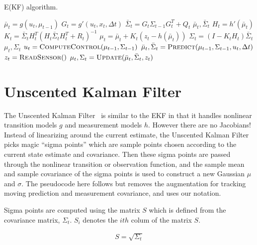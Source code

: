 \documentclass{article}
\begin{document}
\begin{algorithm}
  \caption{E(KF)  algorithm.  }  
  \begin{algorithmic}[1]
    \State $\bar{\mu}_t = g(u_t, \mu_{t-1})$
    \State $G_t = g'(u_t, x_t, \Delta t)$
    \State $\bar{\Sigma}_t = G_t\Sigma_{t-1}G_t^T + Q_t$
    \State \Return $\bar{\mu}_t, \bar{\Sigma}_t$
    \EndFunction
    \State $H_t = h'(\bar{\mu}_t)$
    \State $K_t = \bar{\Sigma}_t H_t^T(H_t \bar{\Sigma}_t H_t^T + R_t)^{-1}$
    \State $\mu_t = \bar{\mu}_t + K_t(z_t - h(\bar{\mu}_t))$
    \State $\Sigma_t = (I - K_t H_t) \bar{\Sigma}_t$
    \State \Return $\mu_t, \Sigma_t$
    \EndFunction
    \State $u_t = \textsc{ComputeControl}(\mu_{t-1}, \Sigma_{t-1})$
    \State $\bar{\mu}_t, \bar{\Sigma}_t = \textsc{Predict}(\mu_{t-1}, \Sigma_{t-1}, u_t, \Delta t)$
    \State $z_t = \textsc{ReadSensor}()$
    \State $\mu_{t}, \Sigma_t = \textsc{Update}(\bar{\mu}_t, \bar{\Sigma}_t, z_t)$
    \EndFunction    
  \end{algorithmic}
\end{algorithm}


\section{Unscented Kalman Filter}

The Unscented Kalman Filter~\citep{wan2000unscented} is similar to the
EKF in that it handles nonlinear transition models $g$ and measurement
models $h$.  However there are no Jacobians!  Instead of linearizing
around the current estimate, the Unscented Kalman Filter picks magic
``sigma points'' which are sample points chosen according to the
current state estimate and covariance.  Then these sigma points are
passed through the nonlinear transition or observation function, and
the sample mean and sample covariance of the sigma points is used to
construct a new Gaussian $\mu$ and $\sigma$.  The pseudocode here
follows \citet{kandepu2008applying} but removes the augmentation for
tracking moving prediction and measurement covariance, and uses our
notation.

Sigma points are computed using the matrix $S$ which is defined from
the covariance matrix, $\Sigma_t$.  $S_i$ denotes the $ith$ colum of
the matrix $S$.

\begin{align}
  S = \sqrt{\Sigma_t}
\end{align}
\end{document}
